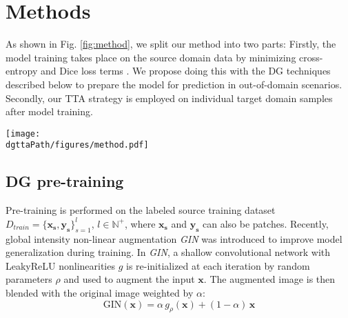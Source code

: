 



\section{Methods}
    \label{sec:method_dgtta}
    As shown in Fig. \ref{fig:method}, we split our method into two parts: Firstly, the model training takes place on the source domain data by minimizing cross-entropy and Dice loss terms \citep{isensee2021nnu}. We propose doing this with the DG techniques described below to prepare the model for prediction in out-of-domain scenarios. Secondly, our TTA strategy is employed on individual target domain samples after model training.
    \begin{figure*}
        \centerline{\texttt{[image: \\dgttaPath/figures/method.pdf]}}
        \caption{Left: Model pre-training with source domain data. We propose to use \emph{GIN}, \emph{MIND} or their combination \emph{GIN+MIND} in this step. Right: \emph{DG-TTA} method applied in the target data domain. Two differently augmented versions of the same input are passed through the pre-trained segmentation network. The network weights are then optimized supervising the predictions with a Dice loss steering the network to produce consistent predictions.}
        \label{fig:method}
    \end{figure*}

    \subsection{DG pre-training}
    Pre-training is performed on the labeled source training dataset $D_{train}=\{\mathbf{x_s},\mathbf{y_s}\}_{s=1}^{l}$, $l\in\mathbb{N}^+$, where $\mathbf{x_s}$ and $\mathbf{y_s}$ can also be patches.
    Recently, global intensity non-linear augmentation \emph{GIN} \citep{ouyang2022causality} was introduced to improve model generalization during training.
    In \emph{GIN}, a shallow convolutional network with LeakyReLU nonlinearities $g$ is re-initialized at each iteration by random parameters $\rho$ and used to augment the input $\mathbf{x}$.
    The augmented image is then blended with the original image weighted by $\alpha$:
    \begin{equation}
        \text{GIN}(\mathbf{x}) = \alpha\,g_\rho(\mathbf{x}) + (1-\alpha)\,\mathbf{x}
    \end{equation}

